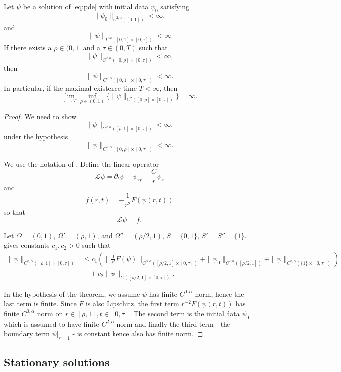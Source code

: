 \documentclass{amsart}
\begin{document}
\begin{lemma}
\label{lem:apriori_bounds}
Let \(\psi\) be a solution of \eqref{eq:pde} with initial data \(\psi_0\) satisfying
\[
\|\psi_0\|_{C^{2,\alpha}([0, 1])} < \infty,
\]
and
\[
\|\psi\|_{L^{\infty} ([0, 1] \times [0, \tau])} < \infty
\]
If there exists a \(\rho \in (0, 1]\) and a \(\tau \in (0, T)\) such that
\[
\|\psi\|_{C^{2,\alpha}([0, \rho] \times [0, \tau])} < \infty,
\]
then
\[
\|\psi\|_{C^{2,\alpha}([0, 1] \times [0, \tau])} < \infty.
\]
In particular, if the maximal existence time \(T < \infty\), then
\[
\lim_{\tau\to T} \inf_{\rho \in (0, 1)} \{\|\psi\|_{C^2([0, \rho] \times [0, \tau])}\} = \infty.
\]
\end{lemma}

\begin{proof}
We need to show
\[
\|\psi\|_{C^{2,\alpha}([\rho, 1] \times [0, \tau])} < \infty,
\]
under the hypothesis
\[
\|\psi\|_{C^{2,\alpha}([0, \rho] \times [0, \tau])} < \infty.
\]

We use the notation of \cite[Theorem 10.1]{Ladyzhenskaja:/1967}. Define the linear operator
\[
\mathcal{L} \psi = \partial_t \psi - \psi_{rr} - \frac{C}{r} \psi_r
\]
and
\[
f(r, t) = -\frac{1}{r^2} F(\psi(r, t))
\]
so that
\[
\mathcal{L} \psi = f.
\]

Let \(\Omega = (0, 1)\), \(\Omega' = (\rho, 1)\), and \(\Omega'' = (\rho/2, 1)\), \(S = \{0, 1\}\), \(S' = S'' = \{1\}\). \cite[Theorem 10.1]{Ladyzhenskaja:/1967} gives constants \(c_1, c_2 > 0\) such that
\[
\begin{split}
\|\psi\|_{C^{2,\alpha}([\rho, 1] \times [0, \tau])} &\leq c_1 \left(\|\tfrac{1}{r^2} F(\psi)\|_{C^{0,\alpha}([\rho/2, 1] \times [0, \tau])} + \|\psi_0\|_{C^{2,\alpha}([\rho/2, 1])} + \|\psi\|_{C^{2,\alpha}(\{1\} \times [0, \tau])} \right) \\
&\quad + c_2 \|\psi\|_{C([\rho/2, 1] \times [0, \tau])}.
\end{split}
\]

In the hypothesis of the theorem, we assume \(\psi\) has finite \(C^{0,\alpha}\) norm, hence the last term is finite. Since \(F\) is also Lipschitz, the first term \(r^{-2} F(\psi(r, t))\) has finite \(C^{0,\alpha}\) norm on \(r \in [\rho, 1], t \in [0, \tau]\). The second term is the initial data \(\psi_0\) which is assumed to have finite \(C^{2,\alpha}\) norm and finally the third term - the boundary term \(\psi|_{r=1}\) - is constant hence also has finite norm.
\end{proof}

\subsection{Stationary solutions}
\end{document}
